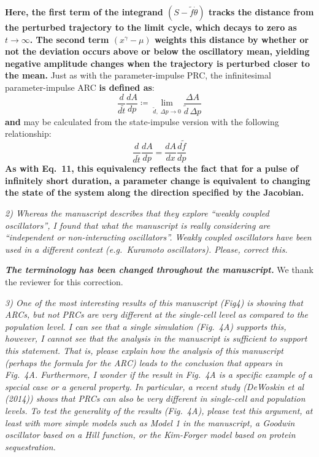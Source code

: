 \documentclass[11pt, letterpaper]{article}
\newenvironment{reviewer}{\itshape\color{gray}}{}
\newenvironment{manuscript}[1]{\begin{center}\begin{tcolorbox}[colback=green!5!white,colframe=green!75!black,width=0.8\textwidth,title={#1},breakable,fonttitle=\bfseries]}{\end{tcolorbox}\end{center}}
\begin{document}
\begin{manuscript}{Page 10}
  {\bfseries Here, the first term of the integrand $(S - \tilde{f}\dot{\theta})$ tracks the distance from the perturbed trajectory to the limit cycle, which decays to zero as $t \to \infty$.
The second term $(x^\gamma - \mu)$ weights this distance by whether or not the deviation occurs above or below the oscillatory mean, yielding negative amplitude changes when the trajectory is perturbed closer to the mean.}
Just as with the parameter-impulse PRC, the infinitesimal parameter-impulse ARC {\bfseries is defined as}:
\begin{equation}
  \frac{d}{d\tilde{t}}\frac{dA}{dp} \coloneqq \lim_{\tilde{d},\; \Delta p \to 0}
  \frac{\Delta A}{\tilde{d}\, \Delta p}
  \tag{31}
\end{equation}
{\bfseries and} may be calculated from the state-impulse version with the following relationship:
\begin{equation}
  \frac{d}{d\tilde{t}}\frac{dA}{dp} = \frac{dA}{dx}\frac{d\tilde{f}}{dp}
  \tag{32}
\end{equation}
{\bfseries As with Eq.~11, this equivalency reflects the fact that for a pulse of infinitely short duration, a parameter change is equivalent to changing the state of the system along the direction specified by the Jacobian.}
\end{manuscript}

\begin{reviewer}
2) Whereas the manuscript describes that they explore ``weakly coupled oscillators'', I found that what the manuscript is really considering are ``independent or non-interacting oscillators''.
Weakly coupled oscillators have been used in a different context (e.g.\ Kuramoto oscillators).
Please, correct this.
\end{reviewer}
 
{\bfseries\itshape The terminology has been changed throughout the manuscript.}
We thank the reviewer for this correction.

\begin{reviewer}
3) One of the most interesting results of this manuscript (Fig4) is showing that ARCs, but not PRCs are very different at the single-cell level as compared to the population level.
I can see that a single simulation (Fig.~4A) supports this, however, I cannot see that the analysis in the manuscript is sufficient to support this statement.
That is, please explain how the analysis of this manuscript (perhaps the formula for the ARC) leads to the conclusion that appears in Fig.~4A.
Furthermore, I wonder if the result in Fig.~4A is a specific example of a special case or a general property.
In particular, a recent study (DeWoskin et al (2014)) shows that PRCs can also be very different in single-cell and population levels.
To test the generality of the results (Fig.~4A), please test this argument, at least with more simple models such as Model 1 in the manuscript, a Goodwin oscillator based on a Hill function, or the Kim-Forger model based on protein sequestration.
\end{reviewer}
 
\end{document}
